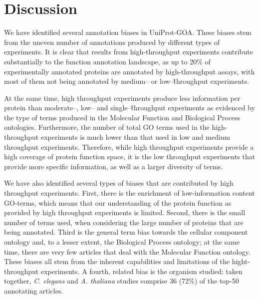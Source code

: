 \documentclass[12pt]{article}
\begin{document}
% 
% 
% 


\section*{Discussion}

We have identified several annotation biases in UniProt-GOA. These biases stem from the
uneven number of annotations produced by different types of experiments. It is clear that
results from high-throughput experiments contribute substantially to the function annotation
landscape, as up to 20\% of experimentally annotated proteins are annotated by
high-throughput assays, with most of them not being annotated by medium-- or
low--\~throughput experiments. 

At the same time, high throughput experiments produce less information per protein than
moderate--, low-- and single--\~throughput experiments as evidenced by the type of terms
produced in the Molecular Function and Biological Process ontologies. Furthermore, the
number of total GO terms used in the high-throughput experiments is much lower than that
used in low and medium throughput experiments. Therefore, while high throughput experiments
provide a high coverage of protein function space, it is the low throughput
experiments that provide more specific information, as well as a larger diversity of terms.

We have also identified several types of biases that are contributed by high throughput
experiments.  First, there is the enrichment of low-information content GO-terms, which
means that our understanding of the protein function as provided by high throughput
experiments is limited.  Second, there is the small number of terms used, when considering
the large number of proteins that are being annotated. Third is the general term bias
towards the cellular component ontology and, to a lesser extent, the Biological Process
ontology; at the same time, there are very few articles that deal with the Molecular
Function ontology.  These biases all stem from the inherent capabilities and limitations of
the hight-throughput experiments.  A fourth, related bias is the organism studied: taken
together, \textit{C. elegans} and \textit{A. thaliana} studies comprise 36 (72\%) of the
top-50 annotating articles. 
\end{document}

